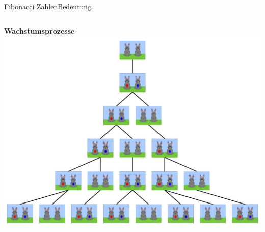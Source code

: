 \documentclass[xelatex,aspectratio=169]{beamer}
\begin{document}
\begin{frame}{Fibonacci Zahlen}{Bedeutung}
  \begin{columns}[t, onlytextwidth]
    \centering \textbf{Wachstumsprozesse}
    \includegraphics[width=\textwidth]{img/fibonacci_rabbit.png}
  \end{columns}
\end{frame}

\end{document}
